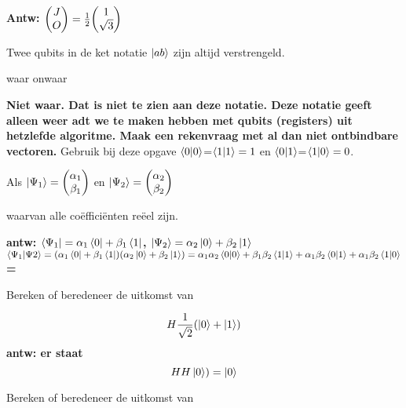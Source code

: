 \documentclass[a4paper, addpoints, 12pt
    , noanswers    %
    ]{exam}
\begin{document}
\begin{questions}
\begin{parts}
\ifprintanswers
\textbf{Antw: $\mqty(J\\O)= \frac{1}{2}\mqty(1\\\sqrt{3})$
}
\else
\fillwithlines{.5in}
\fi
\end{parts}

\question[1]
Twee qubits in de ket notatie $\ket{ab}$ zijn altijd verstrengeld.

\begin{oneparchoices}
\choice waar
\correctchoice onwaar
\end{oneparchoices}


\ifprintanswers
\textbf{Niet waar. Dat is niet te zien aan deze notatie. Deze notatie geeft alleen weer adt we te maken hebben met qubits (registers) uit hetzlefde algoritme. Maak een rekenvraag met al dan niet ontbindbare vectoren.
}
\fi
\question[1]
Gebruik bij deze opgave $\braket{0}{0}$=$\braket{1}{1} = 1$ en
$\braket{0}{1}$=$\braket{1}{0} = 0$.

Als $\ket{\Psi_1}=\mqty(\alpha_1\\\beta_1)$
 en $\ket{\Psi_2}=\mqty(\alpha_2\\\beta_2)$

waarvan alle co\"effici\"enten re\"eel zijn.

\ifprintanswers
\textbf{antw:
$\bra{\Psi_1}=\alpha_1\bra{0} +\beta_1\bra{1}$, 
$\ket{\Psi_2}=\alpha_2\ket{0} +\beta_2\ket{1}$\\
$\braket{\Psi_1}{\Psi2}=(\alpha_1\bra{0} +\beta_1\bra{1})(\alpha_2\ket{0} +\beta_2\ket{1})\\
=\alpha_1\alpha_2\braket{0}{0}+\beta_1\beta_2\braket{1}{1}+\alpha_1\beta_2\braket{0}{1}+\alpha_1\beta_2\braket{1}{0}$=\\
}
\else
\fillwithlines{1in}
\fi

\question[1]
Bereken of beredeneer de uitkomst van 

\[H\frac{1}{\sqrt{2}}(\ket{0}+\ket{1})\]
\ifprintanswers
\textbf{antw:
er staat \[HH\ket{0})=\ket{0}\]
}
\else
\fillwithlines{1in}
\fi

\question[1]
Bereken of beredeneer de uitkomst van 


\end{questions}
\end{document}
